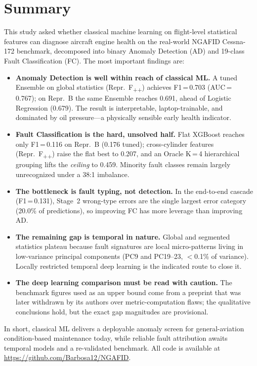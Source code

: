 \section{Summary}
\label{sec:summary}

This study asked whether classical machine learning on flight-level statistical
features can diagnose aircraft engine health on the real-world NGAFID Cessna-172
benchmark, decomposed into binary Anomaly Detection (AD) and 19-class Fault
Classification (FC). The most important findings are:

\begin{itemize}
    \item \textbf{Anomaly Detection is well within reach of classical ML.}
          A tuned Ensemble on global statistics (Repr.~F\textsubscript{++})
          achieves F1\,=\,0.703 (AUC\,=\,0.767); on Repr.~B the same Ensemble
          reaches 0.691, ahead of Logistic Regression (0.679). The result is
          interpretable, laptop-trainable, and dominated by oil pressure---a
          physically sensible early health indicator.

    \item \textbf{Fault Classification is the hard, unsolved half.} Flat XGBoost
          reaches only F1\,=\,0.116 on Repr.~B (0.176 tuned); cross-cylinder
          features (Repr.~F\textsubscript{++}) raise the flat best to 0.207, and
          an Oracle K\,=\,4 hierarchical grouping lifts the \emph{ceiling} to
          0.459. Minority fault classes remain largely unrecognized under a 38:1
          imbalance.

    \item \textbf{The bottleneck is fault typing, not detection.} In the
          end-to-end cascade (F1\,=\,0.131), Stage~2 wrong-type errors are the
          single largest error category (20.0\% of predictions), so improving FC
          has more leverage than improving AD.

    \item \textbf{The remaining gap is temporal in nature.} Global and segmented
          statistics plateau because fault signatures are local micro-patterns
          living in low-variance principal components (PC9 and PC19--23,
          $<$0.1\% of variance). Locally restricted temporal deep learning is the
          indicated route to close it.

    \item \textbf{The deep learning comparison must be read with caution.} The
          benchmark figures used as an upper bound come from a preprint
          \cite{lmsd2025} that was later withdrawn by its authors over
          metric-computation flaws; the qualitative conclusions hold, but the
          exact gap magnitudes are provisional.
\end{itemize}

In short, classical ML delivers a deployable anomaly screen for general-aviation
condition-based maintenance today, while reliable fault attribution awaits
temporal models and a re-validated benchmark. All code is available at
\url{https://github.com/Barbosa12/NGAFID}.
